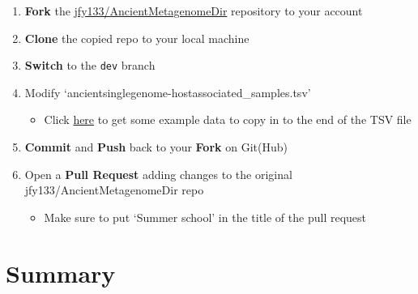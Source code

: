 \documentclass[
  letterpaper,
]{book}
\providecommand{\tightlist}{%
  \setlength{\itemsep}{0pt}\setlength{\parskip}{0pt}}\usepackage{longtable,booktabs,array}
\begin{document}
\begin{tcolorbox}[enhanced jigsaw, opacitybacktitle=0.6, bottomtitle=1mm, opacityback=0, colback=white, coltitle=black, leftrule=.75mm, toprule=.15mm, title=\textcolor{quarto-callout-tip-color}{\faLightbulb}\hspace{0.5em}{Click me to reveal the correct terminology}, colframe=quarto-callout-tip-color-frame, toptitle=1mm, arc=.35mm, left=2mm, titlerule=0mm, breakable, rightrule=.15mm, bottomrule=.15mm, colbacktitle=quarto-callout-tip-color!10!white]

\begin{enumerate}
\def\labelenumi{\arabic{enumi}.}
\tightlist
\item
  \textbf{Fork} the
  \href{https://github.com/jfy133/AncientMetagenomeDir}{jfy133/AncientMetagenomeDir}
  repository to your account
\item
  \textbf{Clone} the copied repo to your local machine
\item
  \textbf{Switch} to the \texttt{dev} branch
\item
  Modify `ancientsinglegenome-hostassociated\_samples.tsv'

  \begin{itemize}
  \tightlist
  \item
    Click
    \href{https://github.com/SPAAM-community/https://github.com/SPAAM-community/wss-summer-school/raw/main/docs/raw/main/docs/assets/data/2022/ancientmetagenomedir_example.tsv}{here}
    to get some example data to copy in to the end of the TSV file
  \end{itemize}
\item
  \textbf{Commit} and \textbf{Push} back to your \textbf{Fork} on
  Git(Hub)
\item
  Open a \textbf{Pull Request} adding changes to the original
  jfy133/AncientMetagenomeDir repo

  \begin{itemize}
  \tightlist
  \item
    Make sure to put `Summer school' in the title of the pull request
  \end{itemize}
\end{enumerate}

\end{tcolorbox}

\hypertarget{summary}{%
\section{Summary}\label{summary}}
\end{document}
